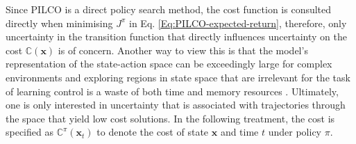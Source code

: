 Since PILCO is a direct policy search method, the cost function is consulted directly when minimising $J^{\pi}$ in Eq. \ref{Eq:PILCO-expected-return}, therefore, only uncertainty in the transition function that directly influences uncertainty on the cost $\mathbb{C}(\mathbf{x})$ is of concern. Another way to view this is that the model's representation of the state-action space can be exceedingly large for complex environments and exploring regions in state space that are irrelevant for the task of learning control is a waste of both time and memory
resources . Ultimately, one is only interested in uncertainty that is associated with trajectories through the space that yield low cost solutions. In the following treatment, the cost is specified as $\mathbb{C}^{\pi}(\mathbf{x}_{t})$ to denote the cost of state $\mathbf{x}$ and time $t$ under policy $\pi$. 


